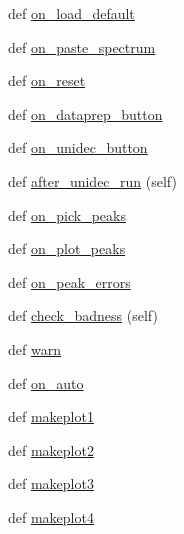 \begin{DoxyCompactItemize}
\item 
def \hyperlink{class_uni_dec_1_1_g_uni_dec_1_1_uni_dec_app_a63e4c1c1ccd5f3b087249fee214ecd6a}{on\+\_\+load\+\_\+default}
\item 
def \hyperlink{class_uni_dec_1_1_g_uni_dec_1_1_uni_dec_app_a4edf6b2579e9952a0f56609d5641de9e}{on\+\_\+paste\+\_\+spectrum}
\item 
def \hyperlink{class_uni_dec_1_1_g_uni_dec_1_1_uni_dec_app_acccb24906699f6214792cb4a1cb2c4dd}{on\+\_\+reset}
\item 
def \hyperlink{class_uni_dec_1_1_g_uni_dec_1_1_uni_dec_app_a9aa6dbdda9184e17a1516f92baf4e753}{on\+\_\+dataprep\+\_\+button}
\item 
def \hyperlink{class_uni_dec_1_1_g_uni_dec_1_1_uni_dec_app_ab201aef8fed8d975d1687e5b06f5e777}{on\+\_\+unidec\+\_\+button}
\item 
def \hyperlink{class_uni_dec_1_1_g_uni_dec_1_1_uni_dec_app_a20c3bd8746429ab511bbeec11fc8fafe}{after\+\_\+unidec\+\_\+run} (self)
\item 
def \hyperlink{class_uni_dec_1_1_g_uni_dec_1_1_uni_dec_app_a4cc8ead18ed888882e1029240e0a49fb}{on\+\_\+pick\+\_\+peaks}
\item 
def \hyperlink{class_uni_dec_1_1_g_uni_dec_1_1_uni_dec_app_a2c940a985d7e5c106f3794f632858b3d}{on\+\_\+plot\+\_\+peaks}
\item 
def \hyperlink{class_uni_dec_1_1_g_uni_dec_1_1_uni_dec_app_a8f5e9dddea965a2c524b43ae39cd68cb}{on\+\_\+peak\+\_\+errors}
\item 
def \hyperlink{class_uni_dec_1_1_g_uni_dec_1_1_uni_dec_app_ace2a88369920c956fbe673b940d5a506}{check\+\_\+badness} (self)
\item 
def \hyperlink{class_uni_dec_1_1_g_uni_dec_1_1_uni_dec_app_afae2a6fb8eb66efb62d5ba4b6f293030}{warn}
\item 
def \hyperlink{class_uni_dec_1_1_g_uni_dec_1_1_uni_dec_app_a6d427a89d37b4edc75a4e2a62c3c53fd}{on\+\_\+auto}
\item 
def \hyperlink{class_uni_dec_1_1_g_uni_dec_1_1_uni_dec_app_a461a31aa2caf2d9d8f3133221ca476a8}{makeplot1}
\item 
def \hyperlink{class_uni_dec_1_1_g_uni_dec_1_1_uni_dec_app_a4c8b6f6f71e623fa509d0fc1fcd8ff88}{makeplot2}
\item 
def \hyperlink{class_uni_dec_1_1_g_uni_dec_1_1_uni_dec_app_a700decfef27e11fce17d2507edd1ca9a}{makeplot3}
\item 
def \hyperlink{class_uni_dec_1_1_g_uni_dec_1_1_uni_dec_app_a961667da7677e34308f337c01c8f6e82}{makeplot4}
\item 

\end{DoxyCompactItemize}
